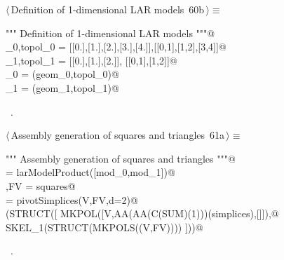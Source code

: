 \documentclass[11pt,oneside]{article}    %
\begin{document}
\begin{flushleft} \small \label{scrap118}
\protect{}$\langle\,$Definition of 1-dimensional LAR models\nobreak\ {\footnotesize 60b}$\,\rangle\equiv$
\vspace{-1ex}
\begin{list}{}{} \item
\mbox{}\verb@""" Definition of 1-dimensional LAR models  """@\\
\mbox{}\verb@geom_0,topol_0 = [[0.],[1.],[2.],[3.],[4.]],[[0,1],[1,2],[3,4]]@\\
\mbox{}\verb@geom_1,topol_1 = [[0.],[1.],[2.]], [[0,1],[1,2]]@\\
\mbox{}\verb@mod_0 = (geom_0,topol_0)@\\
\mbox{}\verb@mod_1 = (geom_1,topol_1)@\\
\mbox{}\verb@@{\NWsep}
\end{list}
\vspace{-1ex}
\footnotesize\addtolength{\baselineskip}{-1ex}
\begin{list}{}{\setlength{\itemsep}{-\parsep}\setlength{\itemindent}{-\leftmargin}}
\item \NWtxtMacroRefIn\ .
\end{list}
\end{flushleft}

\begin{flushleft} \small \label{scrap119}
\protect{}$\langle\,$Assembly generation of squares and triangles\nobreak\ {\footnotesize 61a}$\,\rangle\equiv$
\vspace{-1ex}
\begin{list}{}{} \item
\mbox{}\verb@""" Assembly generation of squares and triangles """@\\
\mbox{}\verb@squares = larModelProduct([mod_0,mod_1])@\\
\mbox{}\verb@V,FV = squares@\\
\mbox{}\verb@simplices = pivotSimplices(V,FV,d=2)@\\
\mbox{}\verb@VIEW(STRUCT([ MKPOL([V,AA(AA(C(SUM)(1)))(simplices),[]]),@\\
\mbox{}\verb@              SKEL_1(STRUCT(MKPOLS((V,FV)))) ]))@\\
\mbox{}\verb@@{\NWsep}
\end{list}
\vspace{-1ex}
\footnotesize\addtolength{\baselineskip}{-1ex}
\begin{list}{}{\setlength{\itemsep}{-\parsep}\setlength{\itemindent}{-\leftmargin}}
\item \NWtxtMacroRefIn\ .
\end{list}
\end{flushleft}
\end{document}
